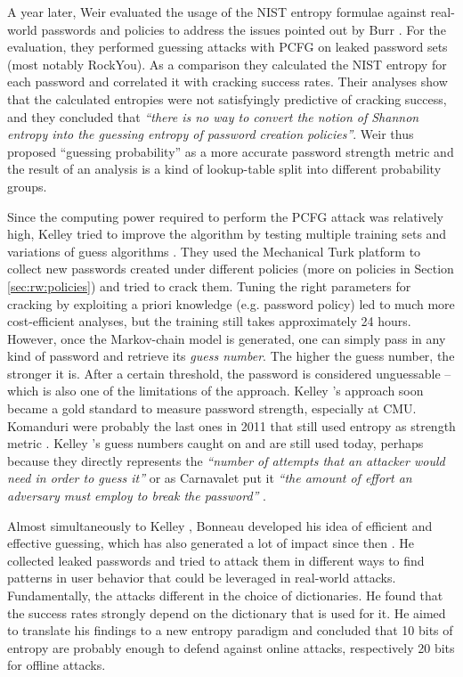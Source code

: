 	A year later, Weir \etal evaluated the usage of the NIST entropy formulae against real-world passwords and policies \cite{Weir2010MetricsPolicies} to address the issues pointed out by Burr \etal. For the evaluation, they performed guessing attacks with PCFG on leaked password sets (most notably RockYou). As a comparison they calculated the NIST entropy for each password and correlated it with cracking success rates. Their analyses show that the calculated entropies were not satisfyingly predictive of cracking success, and they concluded that \textit{``there is no way to convert the notion of Shannon entropy into the guessing entropy of password creation
	policies''}. Weir \etal thus proposed ``guessing probability'' as a more accurate password strength metric and the result of an analysis is a kind of lookup-table split into different probability groups. 

	Since the computing power required to perform the PCFG attack was relatively high, Kelley \etal tried to improve the algorithm by testing multiple training sets and variations of guess algorithms \cite{Kelley2012GuessAgain}. They used the Mechanical Turk platform to collect new passwords created under different policies (more on policies in Section \ref{sec:rw:policies}) and tried to crack them. Tuning the right parameters for cracking by exploiting a priori knowledge (e.g. password policy) led to much more cost-efficient analyses, but the training still takes approximately 24 hours. However, once the Markov-chain model is generated, one can simply pass in any kind of password and retrieve its \textit{guess number}. The higher the guess number, the stronger it is. After a certain threshold, the password is considered unguessable -- which is also one of the limitations of the approach. Kelley \etal's approach soon became a gold standard to measure password strength, especially at CMU. Komanduri \etal were probably the last ones in 2011 that still used entropy as strength metric \cite{Komanduri2011OfPasswordsAndPeople}. Kelley \etal's guess numbers caught on and are still used today, perhaps because they directly represents the \textit{``number of attempts that an attacker would need in order to guess it''} \cite{Dellamico2015MonteCarlo} or as Carnavalet put it \textit{``the amount of effort an adversary must employ to break the password''} \cite{Carnavalet2014AnalyzingPWStrengthMeters}.
	
	Almost simultaneously to Kelley \etal, Bonneau developed his idea of efficient and effective guessing, which has also generated a lot of impact since then \cite{Bonneau2012ScienceOfGuessing}. He collected leaked passwords and tried to attack them in different ways to find patterns in user behavior that could be leveraged in real-world attacks. Fundamentally, the attacks different in the choice of dictionaries. He found that the success rates strongly depend on the dictionary that is used for it. He aimed to translate his findings to a new entropy paradigm and concluded that 10 bits of entropy are probably enough to defend against online attacks, respectively 20 bits for offline attacks. 
	
